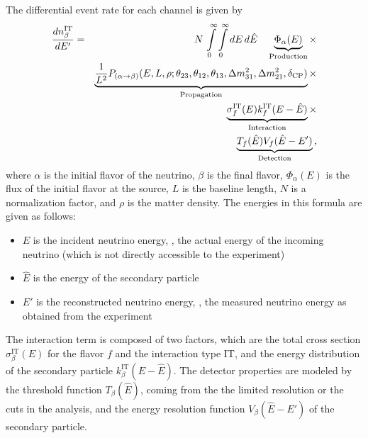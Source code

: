 The differential event rate for each channel is given by
\begin{eqnarray}
\label{eq:master_event}
\frac{dn_{\beta}^{\text{IT}}}{dE'}=&&N\,\int\limits_0^\infty \int\limits_0^\infty dE\,d\hat{E}\quad
\underbrace{\Phi_{\alpha} (E)}_{\mathrm{Production}} \times \nonumber\\
&&\underbrace{\frac{1}{L^2} P_{(\alpha\rightarrow\beta)}(E,L,\rho;\theta_{23},
\theta_{12},\theta_{13},
\Delta m^2_{31},\Delta m^2_{21},\delta_{\mathrm{CP}})}_{\mathrm{Propagation}}
\times \nonumber \\ &&\underbrace{\sigma^{\text{IT}}_f(E)
k_f^{\text{IT}}(E-\hat{E})}_{\mathrm{Interaction}} \times \nonumber \\
&&\underbrace{ T_f(\hat{E}) V_f(\hat{E}-E')}_{\mathrm{Detection}}\,,
\end{eqnarray}
where $\alpha$ is the initial flavor of the neutrino, 
$\beta$ is the final flavor, $\Phi_{\alpha} (E)$ is the flux of the 
initial flavor at the
source, $L$ is the baseline length, $N$ is a normalization factor, and 
$\rho$ is the matter density. The energies in this formula are given as follows:
\begin{itemize}
\item
 $E$ is the incident neutrino energy, \ie, the actual energy of the 
incoming neutrino (which is not directly accessible to the experiment)
\item
 $\hat{E}$ is the energy of the secondary particle
\item
 $E'$ is the reconstructed neutrino energy, \ie, the measured
neutrino energy as obtained from the experiment
\end{itemize}
The interaction term is composed of 
two factors, which are the total cross section 
$\sigma^{\text{IT}}_\beta(E)$ for the flavor $f$ and
the interaction type IT, and the energy distribution of the 
secondary particle $k_\beta^{\text{IT}}(E-\hat{E})$.
The detector properties are 
modeled by the threshold function $T_\beta(\hat{E})$, coming from the the 
limited resolution or the cuts in the analysis, and the energy resolution 
function $V_\beta(\hat{E}-E')$ of the secondary particle. 


